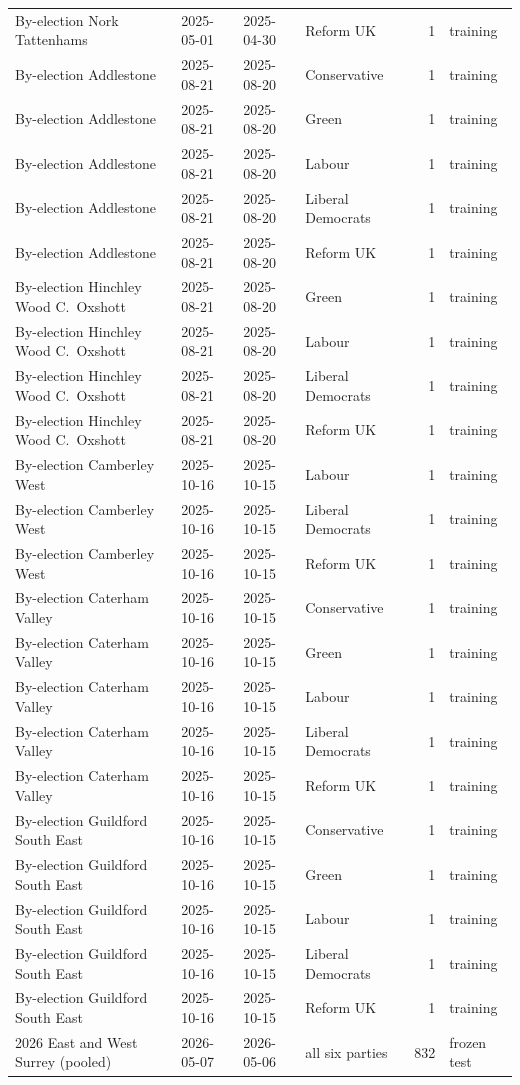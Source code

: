\begin{tabular}{llllrl}
By-election Nork Tattenhams & 2025-05-01 & 2025-04-30 & Reform UK & 1 & training \\
By-election Addlestone & 2025-08-21 & 2025-08-20 & Conservative & 1 & training \\
By-election Addlestone & 2025-08-21 & 2025-08-20 & Green & 1 & training \\
By-election Addlestone & 2025-08-21 & 2025-08-20 & Labour & 1 & training \\
By-election Addlestone & 2025-08-21 & 2025-08-20 & Liberal Democrats & 1 & training \\
By-election Addlestone & 2025-08-21 & 2025-08-20 & Reform UK & 1 & training \\
By-election Hinchley Wood C.\ Oxshott & 2025-08-21 & 2025-08-20 & Green & 1 & training \\
By-election Hinchley Wood C.\ Oxshott & 2025-08-21 & 2025-08-20 & Labour & 1 & training \\
By-election Hinchley Wood C.\ Oxshott & 2025-08-21 & 2025-08-20 & Liberal Democrats & 1 & training \\
By-election Hinchley Wood C.\ Oxshott & 2025-08-21 & 2025-08-20 & Reform UK & 1 & training \\
By-election Camberley West & 2025-10-16 & 2025-10-15 & Labour & 1 & training \\
By-election Camberley West & 2025-10-16 & 2025-10-15 & Liberal Democrats & 1 & training \\
By-election Camberley West & 2025-10-16 & 2025-10-15 & Reform UK & 1 & training \\
By-election Caterham Valley & 2025-10-16 & 2025-10-15 & Conservative & 1 & training \\
By-election Caterham Valley & 2025-10-16 & 2025-10-15 & Green & 1 & training \\
By-election Caterham Valley & 2025-10-16 & 2025-10-15 & Labour & 1 & training \\
By-election Caterham Valley & 2025-10-16 & 2025-10-15 & Liberal Democrats & 1 & training \\
By-election Caterham Valley & 2025-10-16 & 2025-10-15 & Reform UK & 1 & training \\
By-election Guildford South East & 2025-10-16 & 2025-10-15 & Conservative & 1 & training \\
By-election Guildford South East & 2025-10-16 & 2025-10-15 & Green & 1 & training \\
By-election Guildford South East & 2025-10-16 & 2025-10-15 & Labour & 1 & training \\
By-election Guildford South East & 2025-10-16 & 2025-10-15 & Liberal Democrats & 1 & training \\
By-election Guildford South East & 2025-10-16 & 2025-10-15 & Reform UK & 1 & training \\
2026 East and West Surrey (pooled) & 2026-05-07 & 2026-05-06 & all six parties & 832 & frozen test \\
\bottomrule
\end{tabular}
